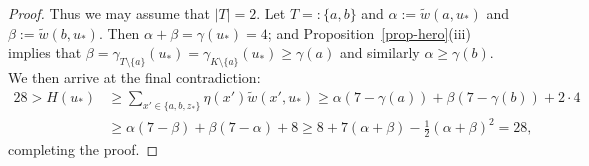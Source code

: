 \documentclass[11pt, a4paper]{article}
\theoremstyle{definition}
\begin{document}
\begin{proof}
	Thus we may assume that $|T| = 2$.
	Let $T =: \lbrace a,b\rbrace$ and $\alpha := \tilde{w}(a,u_*)$ and $\beta := \tilde{w}(b,u_*)$.
	Then $\alpha+\beta=\gamma(u_*)=4$; and Proposition~\ref{prop-hero}(iii) implies that 
	$\beta = \gamma_{T\setminus\{a\}}(u_*) = \gamma_{K\setminus\{a\}}(u_*) \geq \gamma(a)$
	and similarly $\alpha \geq \gamma(b)$. We then arrive at the final contradiction:
	\begin{align*}
		28>H(u_*) &\geq \sum_{x' \in \{a,b,z_*\}}\eta(x')\tilde{w}(x',u_*) \ge \alpha(7-\gamma(a)) + \beta(7-\gamma(b)) + 2\cdot 4\\ &\ge \alpha(7-\beta) + \beta(7-\alpha) + 8\ge  8 + 7(\alpha+\beta)-\frac{1}{2}(\alpha+\beta)^2=28,
	\end{align*}
	completing the proof.
\end{proof}
 

\end{document}
